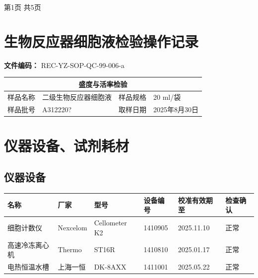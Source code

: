 \documentclass[UTF8,10pt,a4paper,fontset=fandol]{ctexart}
\newcommand{\fieldvalue}[1]{#1}
\newcommand{\handwritten}[1]{#1}
\begin{document}
\begin{center}
第1页 共5页
\end{center}

\newpage

\section*{生物反应器细胞液检验操作记录}

\noindent
\textbf{文件编码：} REC-YZ-SOP-QC-99-006-a

\begin{tabularx}{\textwidth}{|l|X|l|X|}
\hline
\multicolumn{4}{|c|}{盛度与活率检验} \\ \hline
样品名称 &
\fieldvalue{二级生物反应器细胞液} &
样品规格 &
\fieldvalue{\handwritten{20}} ml/袋
\\ \hline
样品批号 &
\fieldvalue{\handwritten{A312220?}} &
取样日期 &
\fieldvalue{\handwritten{2025年8月30日}} \\ \hline
\end{tabularx}

\section{仪器设备、试剂耗材}

\subsection{仪器设备}

\begin{tabularx}{\textwidth}{|X|X|X|X|X|X|}
\hline
名称 & 厂家 & 型号 & 设备编号 & 校准有效期至 & 检查确认 \\
\hline
细胞计数仪 & Nexcelom & Cellometer K2 & 1410905 &
\fieldvalue{\handwritten{2025.11.10}} &
\fieldvalue{正常} \\
\hline
高速冷冻离心机 & Thermo & ST16R & 1410810 &
\fieldvalue{\handwritten{2025.01.17}} &
\fieldvalue{正常} \\
\hline
电热恒温水槽 & 上海一恒 & DK-8AXX & 1411001 &
\fieldvalue{\handwritten{2025.05.22}} &
\fieldvalue{正常} \\
\hline
\end{tabularx}
\end{document}
